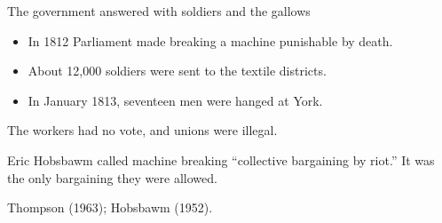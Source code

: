 \documentclass[aspectratio=169,11pt]{beamer}
\begin{document}
\begin{frame}{The government answered with soldiers and the gallows}

\begin{itemize}\setlength\itemsep{0.4em}
    \item In 1812 Parliament made breaking a machine punishable by death.
    \item About 12,000 soldiers were sent to the textile districts.
    \item In January 1813, seventeen men were hanged at York.
\end{itemize}

\vspace{0.35cm}

The workers had no vote, and unions were illegal.

\vspace{0.35cm}

\alert{Eric Hobsbawm called machine breaking ``collective bargaining by riot.'' It was the only bargaining they were allowed.}

\vspace{0.05cm}
{\scriptsize\color{warmgray}Thompson (1963); Hobsbawm (1952).}

\end{frame}
\end{document}
